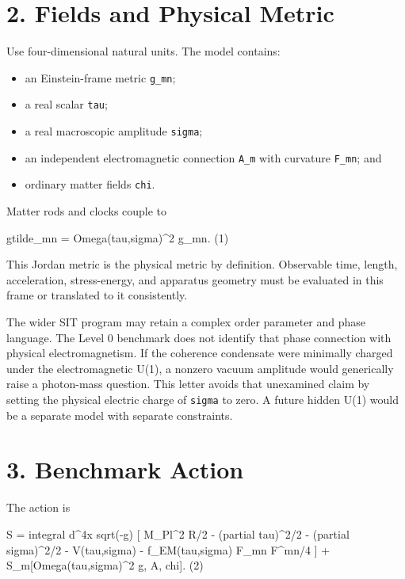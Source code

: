 \documentclass[
  american,
  11pt,
  letterpaper,
]{article}
\newenvironment{Shaded}{}{}
\newcommand{\NormalTok}[1]{#1}
\providecommand{\tightlist}{%
  \setlength{\itemsep}{0pt}\setlength{\parskip}{0pt}}
\begin{document}
\section{2. Fields and Physical Metric}\label{fields-and-physical-metric}

Use four-dimensional natural units. The model contains:

\begin{itemize}
\tightlist
\item
  an Einstein-frame metric \texttt{g\_mn};
\item
  a real scalar \texttt{tau};
\item
  a real macroscopic amplitude \texttt{sigma};
\item
  an independent electromagnetic connection \texttt{A\_m} with curvature \texttt{F\_mn}; and
\item
  ordinary matter fields \texttt{chi}.
\end{itemize}

Matter rods and clocks couple to

\begin{Shaded}
\begin{Highlighting}[]
\NormalTok{gtilde\_mn = Omega(tau,sigma)\^{}2 g\_mn.                            (1)}
\end{Highlighting}
\end{Shaded}

This Jordan metric is the physical metric by definition. Observable time, length, acceleration, stress-energy, and apparatus geometry must be evaluated in this frame or translated to it consistently.

The wider SIT program may retain a complex order parameter and phase language. The Level 0 benchmark does not identify that phase connection with physical electromagnetism. If the coherence condensate were minimally charged under the electromagnetic U(1), a nonzero vacuum amplitude would generically raise a photon-mass question. This letter avoids that unexamined claim by setting the physical electric charge of \texttt{sigma} to zero. A future hidden U(1) would be a separate model with separate constraints.

\section{3. Benchmark Action}\label{benchmark-action}

The action is

\begin{Shaded}
\begin{Highlighting}[]
\NormalTok{S = integral d\^{}4x sqrt({-}g) [}
\NormalTok{      M\_Pl\^{}2 R/2}
\NormalTok{    {-} (partial tau)\^{}2/2}
\NormalTok{    {-} (partial sigma)\^{}2/2}
\NormalTok{    {-} V(tau,sigma)}
\NormalTok{    {-} f\_EM(tau,sigma) F\_mn F\^{}mn/4}
\NormalTok{    ]}
\NormalTok{    + S\_m[Omega(tau,sigma)\^{}2 g, A, chi].                        (2)}
\end{Highlighting}
\end{Shaded}
\end{document}
